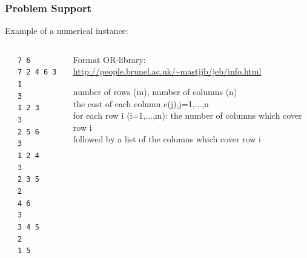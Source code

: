\documentclass[]{beamer}
\begin{document}
\begin{frame}
  \frametitle{Problem Support}

Example of a numerical instance:
\vspace{4mm}

  \begin{columns}
    \begin{column}{.10\textwidth}
    \end{column}
    \begin{column}{.25\textwidth}
   {\footnotesize
    \texttt{7 6                 \\
    7 2 4 6 3 1     \\
    3                    \\
    1 2 3              \\
    3                    \\
    2 5 6              \\
    3                    \\ 
    1 2 4              \\
    3                    \\
    2 3 5              \\
    2                    \\
    4 6                 \\
    3                    \\
    3 4 5              \\
    2                    \\
    1 5                 \\ 
    }
    }
    \end{column}
    \begin{column}{.65\textwidth}
    Format OR-library: {\tiny \url{http://people.brunel.ac.uk/~mastjjb/jeb/info.html}} \\
    \bigskip
    
    number of rows (m), number of columns (n)\\
    \medskip
the cost of each column c(j),j=1,...,n\\
\medskip
for each row i (i=1,...,m): the number of columns which cover row i \\
\medskip
followed by a list of the columns which cover row i
    \end{column}
  \end{columns}
  
\end{frame}
\end{document}
